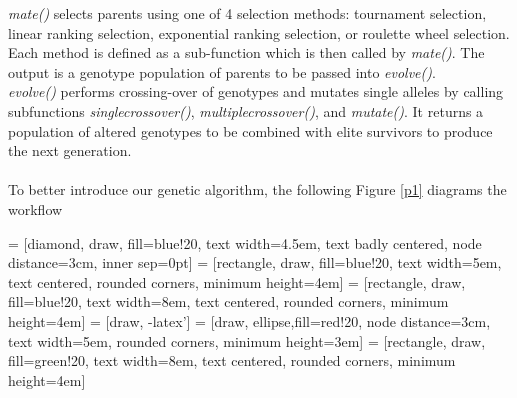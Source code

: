 \documentclass{article}
\begin{document}
\textit{mate()} selects parents using one of 4 selection methods: tournament selection, linear ranking selection, exponential ranking selection, or roulette wheel selection. Each method is defined as a sub-function which is then called by \textit{mate()}. The output is a genotype population of parents to be passed into \textit{evolve()}.\\

\textit{evolve()} performs crossing-over of genotypes and mutates single alleles by calling subfunctions \textit{singlecrossover()}, \textit{multiplecrossover()}, and \textit{mutate()}. It returns a population of altered genotypes to be combined with elite survivors to produce the next generation.\\
\\
To better introduce our genetic algorithm, the following Figure \ref{p1} diagrams the workflow

\vspace{5mm}

 = [diamond, draw, fill=blue!20,
    text width=4.5em, text badly centered, node distance=3cm, inner sep=0pt]
 = [rectangle, draw, fill=blue!20,
    text width=5em, text centered, rounded corners, minimum height=4em]
 = [rectangle, draw, fill=blue!20,
    text width=8em, text centered, rounded corners, minimum height=4em]
 = [draw, -latex']
 = [draw, ellipse,fill=red!20, node distance=3cm, text width=5em,
    rounded corners, minimum height=3em]
 = [rectangle, draw, fill=green!20,
    text width=8em, text centered, rounded corners, minimum height=4em]

\end{document}
